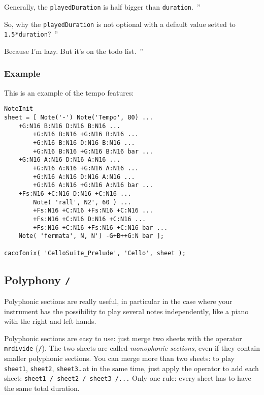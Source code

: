 \documentclass{article}
\newenvironment{meenv}{ \par \noindent \makebox[6em][r]{ \textcolor{mecolor}{Me}: `` --~}}{~''}
\newenvironment{myselfenv}{ \par \noindent \makebox[6em][r]{ \textcolor{myselfcolor}{Myself}: `` --~}}{~''}
\newcommand{\me}[1]{\begin{meenv}#1\end{meenv}}
\newcommand{\myself}[1]{\begin{myselfenv}#1\end{myselfenv}}
\begin{document}
\myself{Generally, the \lstinline!playedDuration! is half bigger than \lstinline!duration!.}
\me{So, why the \lstinline!playedDuration! is not optional with a default value setted to \lstinline!1.5*duration!?}
\myself{Because I'm lazy. But it's on the todo list.}

\subsubsection{Example}

This is an example of the tempo features: \\

\begin{lstlisting}
NoteInit
sheet = [ Note('-') Note('Tempo', 80) ...
	+G:N16 B:N16 D:N16 B:N16 ...
		+G:N16 B:N16 +G:N16 B:N16 ...
		+G:N16 B:N16 D:N16 B:N16 ...
		+G:N16 B:N16 +G:N16 B:N16 bar ...
	+G:N16 A:N16 D:N16 A:N16 ...
		+G:N16 A:N16 +G:N16 A:N16 ...
		+G:N16 A:N16 D:N16 A:N16 ...
		+G:N16 A:N16 +G:N16 A:N16 bar ...
	+Fs:N16 +C:N16 D:N16 +C:N16 ...
		Note( 'rall', N2', 60 ) ...
		+Fs:N16 +C:N16 +Fs:N16 +C:N16 ...
		+Fs:N16 +C:N16 D:N16 +C:N16 ...
		+Fs:N16 +C:N16 +Fs:N16 +C:N16 bar ...
	Note( 'fermata', N, N') -G+B++G:N bar ];

cacofonix( 'CelloSuite_Prelude', 'Cello', sheet );
\end{lstlisting}

\subsection{Polyphony \lstinline!/!}
\label{sec:Polyphony}

Polyphonic sections are really useful, in particular in the case where your instrument has the possibility to play several notes independently, like a piano with the right and left hands.

Polyphonic sections are easy to use: just merge two sheets with the operator \lstinline!mrdivide! (\lstinline!/!). The two sheets are called \emph{monophonic sections}, even if they contain smaller polyphonic sections. You can merge more than two sheets: to play \lstinline!sheet1!, \lstinline!sheet2!, \lstinline!sheet3!\dots at in the same time, just apply the operator to add each sheet: \lstinline!sheet1 / sheet2 / sheet3 /...! Only one rule: every sheet has to have the same total duration.
\end{document}
